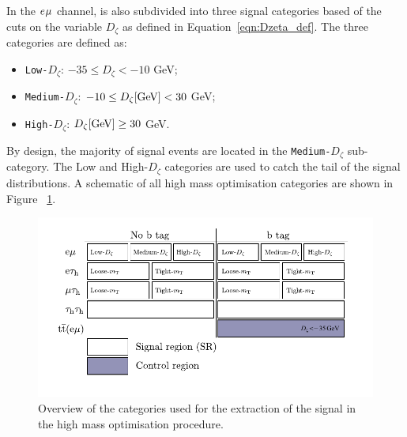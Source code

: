 In the $e_{}\mu_{}$ channel, is also subdivided into three signal categories based of the cuts on the variable $D_{\zeta}$ as defined in Equation~\ref{eqn:Dzeta_def}.
The three categories are defined as:
\begin{itemize}
\item \texttt{Low-$D_\zeta$}: $-35 \leq D_\zeta < -10$ GeV;
\item \texttt{Medium-$D_\zeta$}: $-10 \leq D_\zeta [\text{GeV}] <  30$ GeV;
\item \texttt{High-$D_\zeta$}: $D_\zeta [\text{GeV}] \geq 30$ GeV.
\end{itemize}
By design, the majority of signal events are located in the \texttt{Medium-$D_\zeta$} sub-category.
The Low and High-$D_\zeta$ categories are used to catch the tail of the signal distributions.
A schematic of all high mass optimisation categories are shown in Figure ~\ref{fig:high_mass_categories}. \\

\begin{figure}[!hbtp]
\centering
    \includegraphics[width=1\textwidth]{Figures/high_mass_categories.pdf}
\caption{Overview of the categories used for the extraction of the signal in the high mass optimisation procedure.}
\label{fig:high_mass_categories}
\end{figure}


